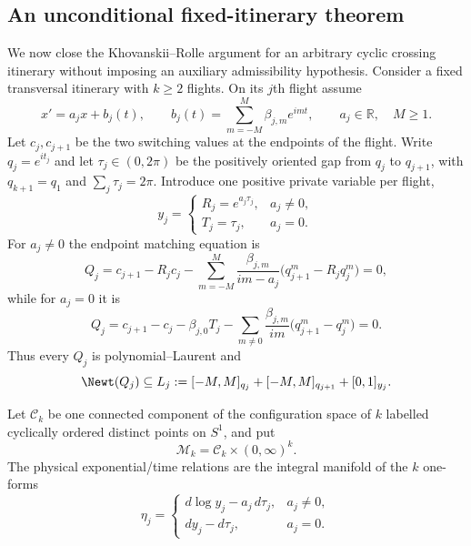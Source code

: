 
\subsection{An unconditional fixed-itinerary theorem}\label{subsec:unconditional-fixed-itinerary}

We now close the Khovanskii--Rolle argument for an arbitrary cyclic crossing
itinerary without imposing an auxiliary admissibility hypothesis.  Consider a
fixed transversal itinerary with $k\ge2$ flights.  On its $j$th flight assume
\begin{equation}\label{eq:uf-model}
 x'=a_jx+b_j(t),\qquad
 b_j(t)=\sum_{m=-M}^{M}\beta_{j,m}e^{imt},
 \qquad a_j\in\mathbb R,\quad M\ge1.
\end{equation}
Let $c_j,c_{j+1}$ be the two switching values at the endpoints of the flight.
Write $q_j=e^{it_j}$ and let $\tau_j\in(0,2\pi)$ be the positively oriented gap
from $q_j$ to $q_{j+1}$, with $q_{k+1}=q_1$ and
$\sum_j\tau_j=2\pi$.  Introduce one positive private variable per flight,
\begin{equation}\label{eq:uf-private}
 y_j=\begin{cases}
 R_j=e^{a_j\tau_j},&a_j\ne0,\\
 T_j=\tau_j,&a_j=0.
 \end{cases}
\end{equation}
For $a_j\ne0$ the endpoint matching equation is
\begin{equation}\label{eq:uf-Q-nonzero}
 Q_j=c_{j+1}-R_jc_j-
 \sum_{m=-M}^{M}\frac{\beta_{j,m}}{im-a_j}
 \bigl(q_{j+1}^m-R_jq_j^m\bigr)=0,
\end{equation}
while for $a_j=0$ it is
\begin{equation}\label{eq:uf-Q-zero}
 Q_j=c_{j+1}-c_j-\beta_{j,0}T_j-
 \sum_{m\ne0}\frac{\beta_{j,m}}{im}
 \bigl(q_{j+1}^m-q_j^m\bigr)=0.
\end{equation}
Thus every $Q_j$ is polynomial--Laurent and
\begin{equation}\label{eq:uf-local-support}
 \Newt(Q_j)\subseteq
 L_j:=[-M,M]_{q_j}+[-M,M]_{q_{j+1}}+[0,1]_{y_j}.
\end{equation}

Let $\mathcal C_k$ be one connected component of the configuration space of
$k$ labelled cyclically ordered distinct points on $S^1$, and put
\begin{equation}\label{eq:uf-M}
 \mathcal M_k=\mathcal C_k\times(0,\infty)^k.
\end{equation}
The physical exponential/time relations are the integral manifold of the
$k$ one-forms
\begin{equation}\label{eq:uf-eta}
 \eta_j=\begin{cases}
 d\log y_j-a_j\,d\tau_j,&a_j\ne0,\\
 dy_j-d\tau_j,&a_j=0.
 \end{cases}
\end{equation}

